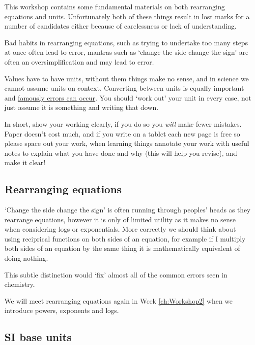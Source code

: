 \documentclass[
]{book}
\begin{document}
This workshop contains some fundamental materials on both rearranging equations and units. Unfortunately both of these things result in lost marks for a number of candidates either because of carelessness or lack of understanding.

Bad habits in rearranging equations, such as trying to undertake too many steps at once often lead to error, mantras such as `change the side change the sign' are often an oversimplification and may lead to error.

Values have to have units, without them things make no sense, and in science we cannot assume units on context. Converting between units is equally important and \href{https://www.bbc.co.uk/news/uk-england-tyne-38744307}{famously errors can occur}. You should `work out' your unit in every case, not just assume it is something and writing that down.

In short, show your working clearly, if you do so you \emph{will} make fewer mistakes. Paper doesn't cost much, and if you write on a tablet each new page is free so please space out your work, when learning things annotate your work with useful notes to explain what you have done and why (this will help you revise), and make it clear!

\hypertarget{rearranging-equations}{%
\subsection{Rearranging equations}\label{rearranging-equations}}

`Change the side change the sign' is often running through peoples' heads as they rearrange equations, however it is only of limited utility as it makes no sense when considering logs or exponentials. More correctly we should think about using reciprical functions on both sides of an equation, for example if I multiply both sides of an equation by the same thing it is mathematically equivalent of doing nothing.

This subtle distinction would `fix' almost all of the common errors seen in chemistry.

We will meet rearranging equations again in Week \ref{ch:Workshop2} when we introduce powers, exponents and logs.

\hypertarget{si-base-units}{%
\subsection{SI base units}\label{si-base-units}}
\end{document}
